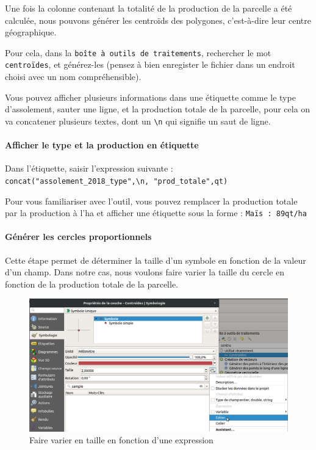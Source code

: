 Une fois la colonne contenant la totalité de la production de la
parcelle a été calculée, nous pouvons générer les centroïds des
polygones, c'est-à-dire leur centre géographique.

Pour cela, dans la \texttt{boîte\ à\ outils\ de\ traitements},
rechercher le mot \texttt{centroïdes}, et générez-les (pensez à bien
enregister le fichier dans un endroit choisi avec un nom
compréhensible).

Vous pouvez afficher plusieurs informations dans une étiquette comme le
type d'assolement, sauter une ligne, et la production totale de la
parcelle, pour cela on va concatener plusieurs textes, dont un
\texttt{\textbackslash{}n} qui signifie un saut de ligne.

\hypertarget{afficher-le-type-et-la-production-en-uxe9tiquette}{%
\paragraph{Afficher le type et la production en
étiquette}\label{afficher-le-type-et-la-production-en-uxe9tiquette}}

Dans l'étiquette, saisir l'expression suivante :
\texttt{concat("assolement\_2018\_type",\textquotesingle{}\textbackslash{}n\textquotesingle{},\ "prod\_totale",\textquotesingle{}qt\textquotesingle{})}

Pour vous familiariser avec l'outil, vous pouvez remplacer la production
totale par la production à l'ha et afficher une étiquette sous la forme
: \texttt{Maïs\ :\ 89qt/ha}

\hypertarget{guxe9nuxe9rer-les-cercles-proportionnels}{%
\paragraph{Générer les cercles
proportionnels}\label{guxe9nuxe9rer-les-cercles-proportionnels}}

Cette étape permet de déterminer la taille d'un symbole en fonction de
la valeur d'un champ. Dans notre cas, nous voulons faire varier la
taille du cercle en fonction de la production totale de la parcelle.

\begin{figure}
\centering
\includegraphics{figures/taille_fonction_champ.png}
\caption{Faire varier en taille en fonction d'une expression}
\end{figure}


